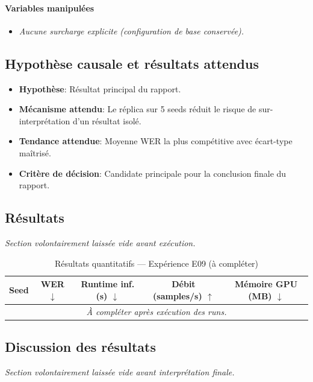 \documentclass[11pt,a4paper]{article}
\begin{document}
\paragraph{Variables manipulées}
\begin{itemize}
\item \textit{Aucune surcharge explicite (configuration de base conservée).}
\end{itemize}

\subsection{Hypothèse causale et résultats attendus}
\begin{itemize}[leftmargin=1.2cm]
\item \textbf{Hypothèse}: Résultat principal du rapport.
\item \textbf{Mécanisme attendu}: Le réplica sur 5 seeds réduit le risque de sur-interprétation d'un résultat isolé.
\item \textbf{Tendance attendue}: Moyenne WER la plus compétitive avec écart-type maîtrisé.
\item \textbf{Critère de décision}: Candidate principale pour la conclusion finale du rapport.
\end{itemize}

\subsection{Résultats}
\textit{Section volontairement laissée vide avant exécution.}

\begin{table}[H]
\centering
\caption{Résultats quantitatifs --- Expérience E09 (à compléter)}
\begin{tabular}{lcccc}
\toprule
Seed & WER $\downarrow$ & Runtime inf. (s) $\downarrow$ & Débit (samples/s) $\uparrow$ & Mémoire GPU (MB) $\downarrow$ \\
\midrule
\multicolumn{5}{c}{\textit{À compléter après exécution des runs.}} \\
\bottomrule
\end{tabular}
\end{table}

\subsection{Discussion des résultats}
\textit{Section volontairement laissée vide avant interprétation finale.}
\end{document}
